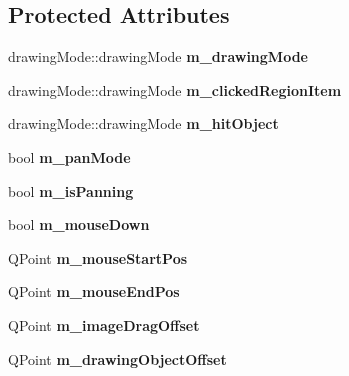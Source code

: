 \subsection*{Protected Attributes}
\begin{DoxyCompactItemize}
\item 
\mbox{\label{class_paint_q_label_ad84973ceabbc9544594caa4ffafacebe}} 
drawing\+Mode\+::drawing\+Mode {\bfseries m\+\_\+drawing\+Mode}
\item 
\mbox{\label{class_paint_q_label_a873b6b1577d51e74e5c3f6a6b4b43288}} 
drawing\+Mode\+::drawing\+Mode {\bfseries m\+\_\+clicked\+Region\+Item}
\item 
\mbox{\label{class_paint_q_label_a148b9dd3ed31146008c34e2b07265c58}} 
drawing\+Mode\+::drawing\+Mode {\bfseries m\+\_\+hit\+Object}
\item 
\mbox{\label{class_paint_q_label_abfd7945edf58ef75b69819472512152c}} 
bool {\bfseries m\+\_\+pan\+Mode}
\item 
\mbox{\label{class_paint_q_label_ae501978fd768bdf7650a19795d4f6982}} 
bool {\bfseries m\+\_\+is\+Panning}
\item 
\mbox{\label{class_paint_q_label_a259be50c06cf9788eddcf3b660deafa5}} 
bool {\bfseries m\+\_\+mouse\+Down}
\item 
\mbox{\label{class_paint_q_label_abcd0f2f7a72475cc6e0367cc075a03ee}} 
Q\+Point {\bfseries m\+\_\+mouse\+Start\+Pos}
\item 
\mbox{\label{class_paint_q_label_a8bd70c097f0b296fe8567101f6af3a43}} 
Q\+Point {\bfseries m\+\_\+mouse\+End\+Pos}
\item 
\mbox{\label{class_paint_q_label_ae9c0765bb296330176651d8bcf6beb1d}} 
Q\+Point {\bfseries m\+\_\+image\+Drag\+Offset}
\item 
\mbox{\label{class_paint_q_label_a83b2f10f11b4d13e3ada1d504eb58a1e}} 
Q\+Point {\bfseries m\+\_\+drawing\+Object\+Offset}
\end{DoxyCompactItemize}


